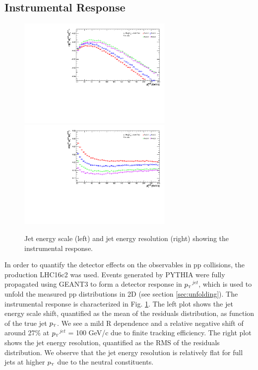 \documentclass[ALICE]{ALICE_analysis_notes}
\newcommand{\pT}{$p_{\mbox{\tiny T}}$\xspace}
\begin{document}
\subsection{Instrumental Response}
\label{sec:InstResponse}

\begin{figure}[h!]
    \centering
    \begin{multicols}{2}
            \includegraphics[width=7.5cm]{figures/EnergyScale/EnergyScaleMean.pdf}
        \vfill\null 
        \columnbreak
            \includegraphics[width=7.5cm]{figures/EnergyScale/EnergyScaleWidth.pdf}
        \vfill\null
    \end{multicols}
    \caption{Jet energy scale (left) and jet energy resolution (right) showing the instrumental response.}
    \label{fig:EnergyScale}
\end{figure}

In order to quantify the detector effects on the observables in pp collisions, the production LHC16c2 was used. Events generated by PYTHIA were fully propagated using GEANT3 to form a detector response in \pT$^{jet}$, which is used to unfold the measured pp distributions in 2D (see section \ref{sec:unfolding}). The instrumental response is characterized in Fig. \ref{fig:EnergyScale}. The left plot shows the jet energy scale shift, quantified as the mean of the residuals distribution, as function of the true jet \pT. We see a mild R dependence and a relative negative shift of around 27\% at \pT$^{jet}$ = 100 GeV/c due to finite tracking efficiency. The right plot shows the jet energy resolution, quantified as the RMS of the residuals distribution. We observe that the jet energy resolution is relatively flat for full jets at higher \pT due to the neutral constituents.
\end{document}
